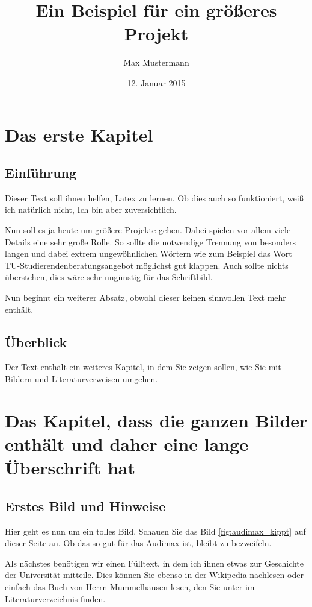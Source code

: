 \documentclass[12pt,a4paper,bibliography=totoc]{scrbook}
\begin{document}
\title{Ein Beispiel für ein größeres Projekt}
\author{Max Mustermann}
\date{12. Januar 2015}
\maketitle
\tableofcontents
\listoffigures

\chapter{Das erste Kapitel}

\section*{Einführung}
Dieser Text soll ihnen helfen, Latex zu lernen. Ob dies auch so funktioniert,
weiß ich natürlich nicht, Ich bin aber zuversichtlich.

Nun soll es ja heute um größere Projekte gehen. Dabei spielen vor allem viele
Details eine sehr große Rolle. So sollte die notwendige Trennung von besonders
langen und dabei extrem ungewöhnlichen Wörtern wie zum Beispiel das Wort
TU-Stu\-die\-ren\-den\-be\-ra\-tungs\-an\-ge\-bot möglichst gut klappen. Auch
sollte nichts überstehen, dies wäre sehr ungünstig für das Schriftbild.

Nun beginnt ein weiterer Absatz, obwohl dieser keinen sinnvollen Text mehr
enthält.

\section*{Überblick}
Der Text enthält ein weiteres Kapitel, in dem Sie zeigen sollen, wie Sie mit
Bildern und Literaturverweisen umgehen.

\chapter[Bilder]{Das Kapitel, dass die ganzen Bilder enthält und daher eine
lange Überschrift hat}

\section{Erstes Bild und Hinweise}
Hier geht es nun um ein tolles Bild. Schauen Sie das Bild \ref{fig:audimax_kippt}
auf dieser Seite an. Ob das so gut für das Audimax ist, bleibt zu bezweifeln.

Als nächstes benötigen wir einen Fülltext, in dem ich ihnen etwas zur Geschichte
der Universität mitteile. Dies können Sie ebenso in der Wikipedia nachlesen oder
einfach das Buch von Herrn Mummelhausen lesen, den Sie unter \cite{mummel} im
Literaturverzeichnis finden.
\end{document}
